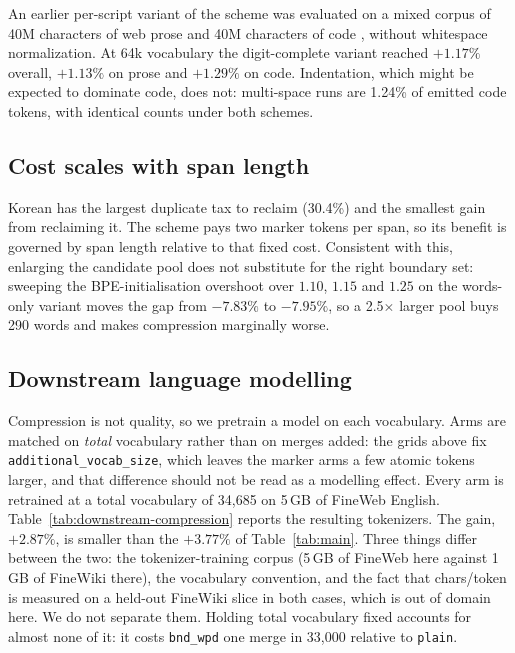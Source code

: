 \documentclass[11pt]{article}
\newcommand{\bnd}[1]{\texttt{bnd\_#1}}
\begin{document}
An earlier per-script variant of the scheme was evaluated on a mixed corpus of 40M
characters of web prose and 40M characters of code \citep{codeparrot,rosettacode}, without
whitespace normalization. At 64k vocabulary the digit-complete variant reached $+1.17\%$
overall, $+1.13\%$ on prose and $+1.29\%$ on code. Indentation, which might be expected to
dominate code, does not: multi-space runs are 1.24\% of emitted code tokens, with identical
counts under both schemes.

\subsection{Cost scales with span length}

Korean has the largest duplicate tax to reclaim (30.4\%) and the smallest gain from
reclaiming it. The scheme pays two marker tokens per span, so its benefit is governed by
span length relative to that fixed cost. Consistent with this, enlarging the candidate pool
does not substitute for the right boundary set: sweeping the BPE-initialisation overshoot
\citep{land2026mingram} over $1.10$, $1.15$ and $1.25$ on the words-only variant moves the
gap from $-7.83\%$ to $-7.95\%$, so a 2.5$\times$ larger pool buys 290 words and makes
compression marginally worse.

\subsection{Downstream language modelling}
\label{sec:downstream}

Compression is not quality, so we pretrain a model on each vocabulary. Arms are matched on
\emph{total} vocabulary rather than on merges added: the grids above fix
\texttt{additional\_vocab\_size}, which leaves the marker arms a few atomic tokens larger, and
that difference should not be read as a modelling effect. Every arm is retrained at a total
vocabulary of 34{,}685 on 5\,GB of FineWeb English. Table~\ref{tab:downstream-compression} reports the
resulting tokenizers. The gain, $+2.87\%$, is smaller than the $+3.77\%$ of
Table~\ref{tab:main}. Three things differ between the two: the tokenizer-training corpus
(5\,GB of FineWeb here against 1\,GB of FineWiki there), the vocabulary convention, and the
fact that chars/token is measured on a held-out FineWiki slice in both cases, which is out of
domain here. We do not separate them. Holding total vocabulary fixed accounts for almost none
of it: it costs \bnd{wpd} one merge in 33{,}000 relative to \texttt{plain}.
\end{document}
